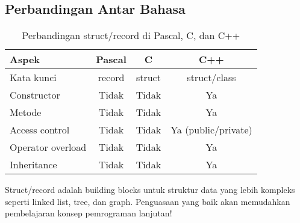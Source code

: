 \documentclass[../main.tex]{subfiles}
\begin{document}
\subsection{Perbandingan Antar Bahasa}

\begin{table}[H]
\centering
\begin{tabular}{|l|c|c|c|}
\hline
\textbf{Aspek} & \textbf{Pascal} & \textbf{C} & \textbf{C++} \\
\hline
Kata kunci & record & struct & struct/class \\
\hline
Constructor & Tidak & Tidak & Ya \\
\hline
Metode & Tidak & Tidak & Ya \\
\hline
Access control & Tidak & Tidak & Ya (public/private) \\
\hline
Operator overload & Tidak & Tidak & Ya \\
\hline
Inheritance & Tidak & Tidak & Ya \\
\hline
\end{tabular}
\caption{Perbandingan struct/record di Pascal, C, dan C++}
\end{table}

Struct/record adalah building blocks untuk struktur data yang lebih kompleks seperti linked list, tree, dan graph. Penguasaan yang baik akan memudahkan pembelajaran konsep pemrograman lanjutan!
\end{document}
